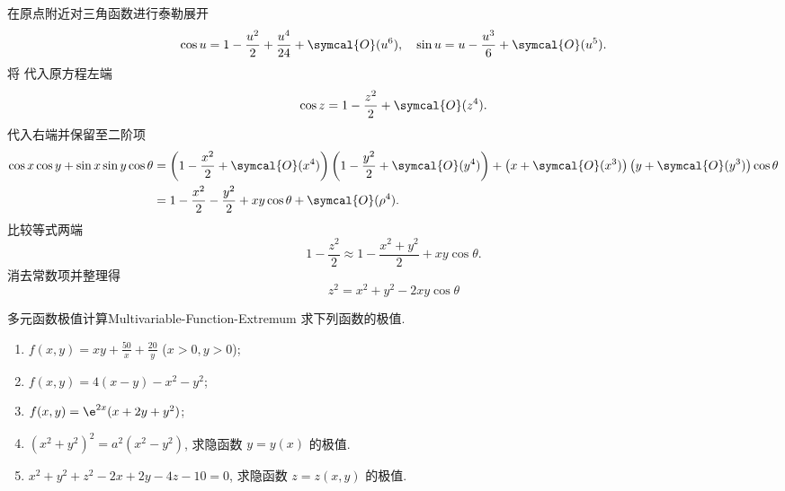 \begin{myproof}
    在原点附近对三角函数进行泰勒展开
    \begin{equation}
        \cos u = 1 - \frac{u^2}{2} + \frac{u^4}{24} + \symcal{O}(u^6), \quad \sin u = u - \frac{u^3}{6} + \symcal{O}(u^5). \label{eq:taylor-trig}
    \end{equation}
    将  代入原方程左端
    \begin{equation}
        \cos z = 1 - \frac{z^2}{2} + \symcal{O}(z^4).
    \end{equation}
    代入右端并保留至二阶项
    \begin{equation}
        \begin{aligned}
            \cos x \cos y + \sin x \sin y \cos \theta & = \left( 1 - \frac{x^2}{2} + \symcal{O}(x^4) \right) \left( 1 - \frac{y^2}{2} + \symcal{O}(y^4) \right) + \left( x + \symcal{O}(x^3) \right) \left( y + \symcal{O}(y^3) \right) \cos \theta \\
                                                      & = 1 - \frac{x^2}{2} - \frac{y^2}{2} + xy \cos \theta + \symcal{O}(\rho^4).
        \end{aligned}
    \end{equation}
    比较等式两端
    \begin{equation}
        1 - \frac{z^2}{2} \approx 1 - \frac{x^2 + y^2}{2} + xy \cos \theta.
    \end{equation}
    消去常数项并整理得
    \begin{equation}
        \boxed{z^2 = x^2 + y^2 - 2xy \cos \theta}
    \end{equation}
\end{myproof}


\begin{problem}{多元函数极值计算}{Multivariable-Function-Extremum}
    求下列函数的极值.
    \begin{enumerate}
        \item $f(x, y) = xy + \frac{50}{x} + \frac{20}{y}$ ($x > 0, y > 0$);
        \item $f(x, y) = 4(x - y) - x^2 - y^2$;
        \item $f(x, y) = \e^{2x}(x + 2y + y^2)$;
        \item $(x^2 + y^2)^2 = a^2(x^2 - y^2)$, 求隐函数 $y = y(x)$ 的极值.
        \item $x^2 + y^2 + z^2 - 2x + 2y - 4z - 10 = 0$, 求隐函数 $z = z(x, y)$ 的极值.
    \end{enumerate}
\end{problem}

